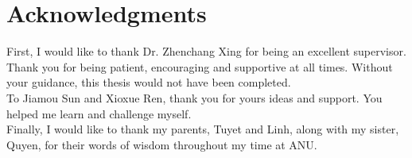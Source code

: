 \chapter*{Acknowledgments}

First, I would like to thank Dr. Zhenchang Xing for being an excellent supervisor. Thank you for being patient, encouraging and supportive at all times. Without your guidance, this thesis would not have been completed. \\
To Jiamou Sun and Xioxue Ren, thank you for yours ideas and support. You helped me learn and challenge myself.\\
Finally, I would like to thank my parents, Tuyet and Linh, along with my sister, Quyen, for their words of wisdom throughout my time at ANU.

